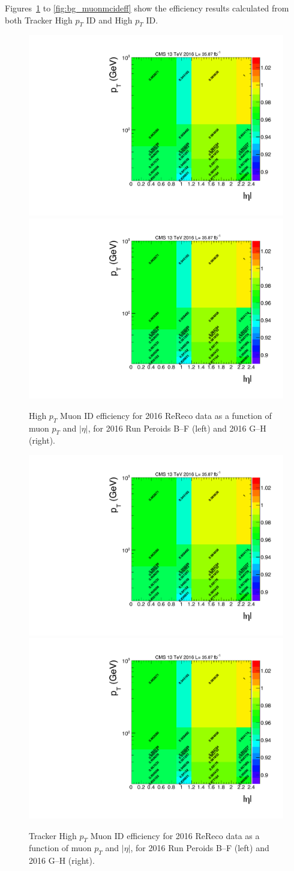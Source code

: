 \vspace{0.3cm}
Figures~\ref{fig:bg_muontkideff} to \ref{fig:bg_muonmcideff} show the efficiency results calculated from both Tracker High $p_T$ ID and High $p_T$ ID.

\begin{figure}[htbp]
\begin{center}
\includegraphics[width=0.49\linewidth, page=1]{figures/bg_muonidisoeff.pdf}
\includegraphics[width=0.49\linewidth, page=2]{figures/bg_muonidisoeff.pdf}
\caption{High $p_T$ Muon ID efficiency for 2016 ReReco data as a function of muon $p_T$ and $|\eta|$, for 2016 Run Peroids B--F (left) and 2016 G--H (right).}
\label{fig:bg_muontkideff}
\end{center}
\end{figure}

\begin{figure}[htbp]
\begin{center}
\includegraphics[width=0.49\linewidth, page=3]{figures/bg_muonidisoeff.pdf}
\includegraphics[width=0.49\linewidth, page=4]{figures/bg_muonidisoeff.pdf}
\caption{Tracker High $p_T$ Muon ID efficiency for 2016 ReReco data as a function of muon $p_T$ and $|\eta|$, for 2016 Run Peroids B--F (left) and 2016 G--H (right).}
\label{fig:bg_muonideff}
\end{center}
\end{figure}

